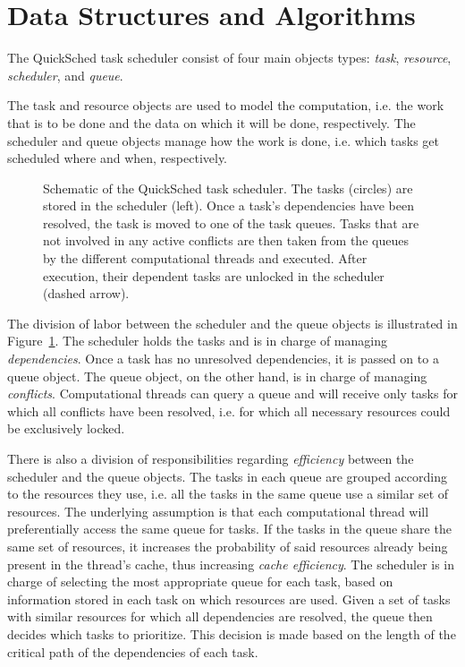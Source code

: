 \documentclass[preprint]{elsarticle}
\newcommand{\fig}[1]
    {Figure~\ref{fig:#1}}
\begin{document}
\section{Data Structures and Algorithms}

The QuickSched task scheduler consist of four main
objects types: {\em task}, {\em resource}, {\em scheduler},
and {\em queue}.

The task and resource objects are used
to model the computation, i.e. the work that is to be done
and the data on which it will be done, respectively.
The scheduler and queue objects manage
how the work is done, i.e. which tasks get scheduled
where and when, respectively.

\begin{figure}
    \centerline{}
    \caption{Schematic of the QuickSched task scheduler.
        The tasks (circles) are stored in the scheduler (left).
        Once a task's dependencies have been resolved, the task
        is moved to one of the task queues.
        Tasks that are not involved in any active conflicts
        are then taken from the queues by the different
        computational threads and executed.
        After execution, their dependent tasks are unlocked
        in the scheduler (dashed arrow).}
    \label{fig:QSched}
\end{figure}

The division of labor between the scheduler and
the queue objects is illustrated in \fig{QSched}.
The scheduler holds the tasks and is in charge
of managing {\em dependencies}.
Once a task has no unresolved dependencies, it is passed
on to a queue object.
The queue object, on the other hand, is in charge
of managing {\em conflicts}.
Computational threads can query a queue and will
receive only tasks for which all conflicts have been
resolved, i.e. for which all necessary resources could be 
exclusively locked.

There is also a division of responsibilities regarding
{\em efficiency} between the scheduler and the queue
objects.
The tasks in each queue are grouped according to the resources
they use, i.e. all the tasks in the same queue use a
similar set of resources.
The underlying assumption is that each computational
thread will preferentially access the same queue for tasks.
If the tasks in the queue share the same set of resources,
it increases the probability of said resources already
being present in the thread's cache, thus increasing
{\em cache efficiency}.
The scheduler is in charge of selecting the most appropriate
queue for each task, based on information stored in each task
on which resources are used.
Given a set of tasks with similar resources for which all
dependencies are resolved, the queue then decides which
tasks to prioritize.
This decision is made based on the length of the critical
path of the dependencies of each task.
\end{document}
